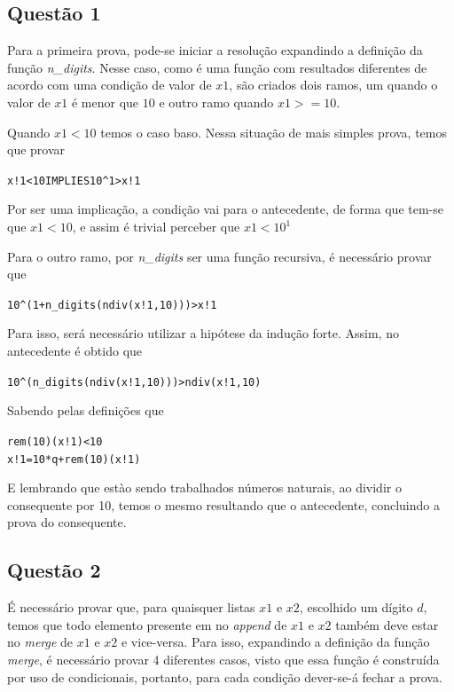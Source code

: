 \documentclass[a4paper, 12pt]{article}
\begin{document}
\label{sec:Solucoes}
\subsection{Questão 1}
\label{sec:sol-q1}

    Para a primeira prova, pode-se iniciar a resolução expandindo a definição da função \textit{n\_digits}.
    Nesse caso, como é uma função com resultados diferentes de acordo com uma condição de valor de $x1$,
    são criados dois ramos, um quando o valor de $x1$ é menor que $10$ e outro ramo quando $x1 >= 10$.
    
    Quando $x1 < 10$ temos o caso baso. Nessa situação de mais simples prova, temos que provar
    \begin{alltt}
    x!1 < 10 IMPLIES 10 ^ 1 > x!1
    \end{alltt}
    Por ser uma implicação, a condição vai para o antecedente, de forma que tem-se que $x1 < 10$, e assim é trivial perceber que $x1 < 10^1$
    
    Para o outro ramo, por \textit{n\_digits} ser uma função recursiva, é necessário provar que
    \begin{alltt}
    10 ^(1 + n_digits(ndiv(x!1, 10))) > x!1
    \end{alltt}
    Para isso, será necessário utilizar a hipótese da indução forte. Assim, no antecedente é obtido que 
    \begin{alltt}
    10 ^(n_digits(ndiv(x!1, 10))) > ndiv(x!1, 10)
    \end{alltt}
    Sabendo pelas definições que
    \begin{alltt}
    rem(10)(x!1) < 10
    x!1 = 10 * q + rem(10)(x!1)
    \end{alltt}
    E lembrando que estào sendo trabalhados números naturais, ao dividir o consequente por 10, temos o mesmo resultando que o antecedente, concluindo a prova do consequente. 

\subsection{Questão 2}
\label{sec:sol-q2}
    É necessário provar que, para quaisquer listas $x1$ e $x2$, escolhido um dígito $d$, temos que todo elemento presente em no \textit{append} de $x1$ e $x2$ também deve estar no \textit{merge} de $x1$ e $x2$ e vice-versa. Para isso, expandindo a definição da função \textit{merge}, é necessário provar 4 diferentes casos, visto que essa função é construída por uso de condicionais, portanto, para cada condição dever-se-á fechar a prova. 
    
\end{document}
